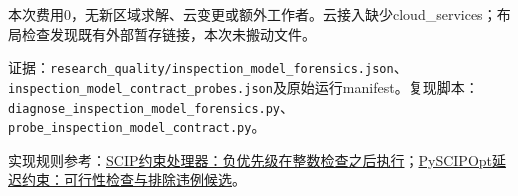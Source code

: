 \begin{center}
\begin{tabular}{p{12mm}p{70mm}p{75mm}}
\bottomrule\end{tabular}\end{center}\footnotesize 本次费用0，无新区域求解、云变更或额外工作者。云接入缺少cloud\_services；布局检查发现既有外部暂存链接，本次未搬动文件。\par\footnotesize 证据：\texttt{research\_quality/inspection\_model\_forensics.json}、\texttt{inspection\_model\_contract\_probes.json}及原始运行manifest。复现脚本：\texttt{diagnose\_inspection\_model\_forensics.py}、\texttt{probe\_inspection\_model\_contract.py}。\par\footnotesize 实现规则参考：\href{https://www.scipopt.org/doc/html/CONS.php}{SCIP约束处理器：负优先级在整数检查之后执行}；\href{https://pyscipopt.readthedocs.io/en/latest/tutorials/lazycons.html}{PySCIPOpt延迟约束：可行性检查与排除违例候选}。
